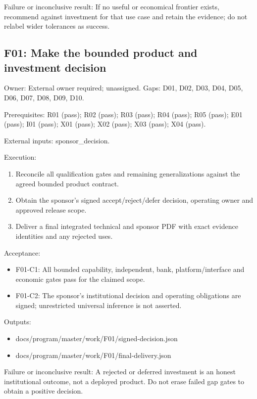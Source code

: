 \documentclass[
  11pt,
  a4paper,
]{article}
\providecommand{\tightlist}{%
  \setlength{\itemsep}{0pt}\setlength{\parskip}{0pt}}
\begin{document}
Failure or inconclusive result: If no useful or economical frontier
exists, recommend against investment for that use case and retain the
evidence; do not relabel wider tolerances as success.

\hypertarget{f01-make-the-bounded-product-and-investment-decision}{%
\subsection{F01: Make the bounded product and investment
decision}\label{f01-make-the-bounded-product-and-investment-decision}}

Owner: External owner required; unassigned. Gaps: D01, D02, D03, D04,
D05, D06, D07, D08, D09, D10.

Prerequisites: R01 (pass); R02 (pass); R03 (pass); R04 (pass); R05
(pass); E01 (pass); I01 (pass); X01 (pass); X02 (pass); X03 (pass); X04
(pass).

External inputs: sponsor\_decision.

Execution:

\begin{enumerate}
\def\labelenumi{\arabic{enumi}.}
\tightlist
\item
  Reconcile all qualification gates and remaining generalizations
  against the agreed bounded product contract.
\item
  Obtain the sponsor's signed accept/reject/defer decision, operating
  owner and approved release scope.
\item
  Deliver a final integrated technical and sponsor PDF with exact
  evidence identities and any rejected uses.
\end{enumerate}

Acceptance:

\begin{itemize}
\tightlist
\item
  F01-C1: All bounded capability, independent, bank, platform/interface
  and economic gates pass for the claimed scope.
\item
  F01-C2: The sponsor's institutional decision and operating obligations
  are signed; unrestricted universal inference is not asserted.
\end{itemize}

Outputs:

\begin{itemize}
\tightlist
\item
  docs/program/master/work/F01/signed-decision.json
\item
  docs/program/master/work/F01/final-delivery.json
\end{itemize}

Failure or inconclusive result: A rejected or deferred investment is an
honest institutional outcome, not a deployed product. Do not erase
failed gap gates to obtain a positive decision.
\end{document}
